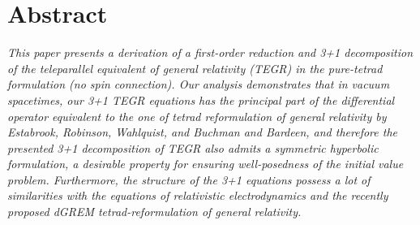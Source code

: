 \documentclass[
10pt, %
a4paper, %
oneside, %
twocolumn,
headinclude,footinclude, %
BCOR5mm, %
]{scrartcl}
\begin{document}
	\section*{Abstract} %
	\noindent
	\textit{ This paper presents a derivation of a first-order reduction and 3+1
	decomposition of the teleparallel equivalent of general relativity (TEGR) in
	the pure-tetrad formulation (no spin connection). Our analysis demonstrates
	that in vacuum spacetimes, our 3+1 TEGR equations has the principal part of
	the differential operator equivalent to the one of tetrad reformulation of
	general relativity by Estabrook, Robinson, Wahlquist, and Buchman and
	Bardeen, and therefore the presented 3+1 decomposition of TEGR also admits a
	symmetric hyperbolic formulation, a desirable property for ensuring
	well-posedness of the initial value problem. Furthermore, the structure of
	the 3+1 equations possess a lot of similarities with the equations of
	relativistic electrodynamics and the recently proposed dGREM
	tetrad-reformulation of general relativity. }
	\renewcommand{\thefootnote}{\arabic{footnote}}
	
\end{document}
